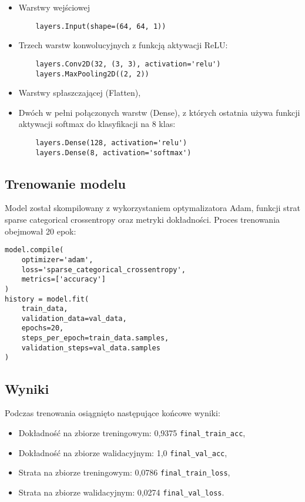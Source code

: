 \begin{itemize}
    \item Warstwy wejściowej
    \begin {verbatim}
    layers.Input(shape=(64, 64, 1))
    \end {verbatim}
    \item Trzech warstw konwolucyjnych z funkcją aktywacji ReLU:
    \begin{verbatim}
    layers.Conv2D(32, (3, 3), activation='relu')
    layers.MaxPooling2D((2, 2))
    \end{verbatim}
    \item Warstwy spłaszczającej (Flatten),
    \item Dwóch w pełni połączonych warstw (Dense), z których ostatnia używa funkcji aktywacji softmax do klasyfikacji na 8 klas:
    \begin{verbatim}
    layers.Dense(128, activation='relu')
    layers.Dense(8, activation='softmax')
    \end{verbatim}
\end{itemize}

\subsection{Trenowanie modelu}\label{subsec:trenowanie-modelu}

Model został skompilowany z wykorzystaniem optymalizatora Adam, funkcji strat sparse categorical crossentropy oraz metryki dokładności.
Proces trenowania obejmował 20 epok:

\begin{verbatim}
model.compile(
    optimizer='adam',
    loss='sparse_categorical_crossentropy',
    metrics=['accuracy']
)
history = model.fit(
    train_data,
    validation_data=val_data,
    epochs=20,
    steps_per_epoch=train_data.samples,
    validation_steps=val_data.samples
)
\end{verbatim}

\subsection{Wyniki}\label{subsec:wyniki}

Podczas trenowania osiągnięto następujące końcowe wyniki:

\begin{itemize}
    \item Dokładność na zbiorze treningowym: 0,9375 \texttt{final\_train\_acc},
    \item Dokładność na zbiorze walidacyjnym: 1,0  \texttt{final\_val\_acc},
    \item Strata na zbiorze treningowym: 0,0786  \texttt{final\_train\_loss},
    \item Strata na zbiorze walidacyjnym: 0,0274  \texttt{final\_val\_loss}.
\end{itemize}


